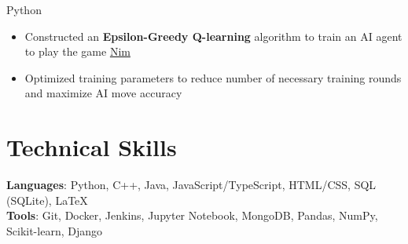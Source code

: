 \documentclass[letterpaper,11pt]{article}
\begin{document}
{Python}{}
\begin{itemize}[leftmargin=*]
    \item \vspace{-3pt} \small Constructed an \textbf{Epsilon-Greedy Q-learning}
          algorithm to train an AI agent to play the game
          \href{https://en.wikipedia.org/wiki/Nim}{Nim}
    \item \vspace{-7pt} \small Optimized training parameters to reduce number
          of necessary training rounds and maximize AI move accuracy
\end{itemize}

\section{Technical Skills}
\textbf{Languages}: Python, C++, Java, JavaScript/TypeScript, HTML/CSS, SQL
(SQLite), \LaTeX \\
\textbf{Tools}: Git, Docker, Jenkins, Jupyter Notebook,
MongoDB, Pandas, NumPy, Scikit-learn, Django
\end{document}
